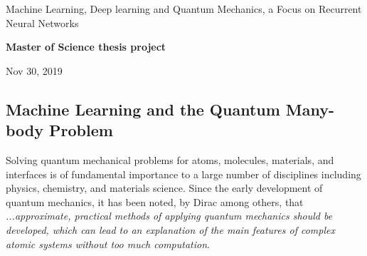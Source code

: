 \documentclass[%
oneside,                 %
final,                   %
10pt]{article}
\begin{document}

\newcommand{\exercisesection}[1]{\subsection*{#1}}






\thispagestyle{empty}

\begin{center}
{\LARGE\bf
\begin{spacing}{1.25}
Machine Learning, Deep learning and Quantum Mechanics, a Focus on Recurrent Neural Networks
\end{spacing}
}
\end{center}


\begin{center}
{\bf Master of Science thesis project${}^{}$} \\ [0mm]
\end{center}

\begin{center}
\end{center}
    

\begin{center}
Nov 30, 2019
\end{center}

\vspace{1cm}


\subsection*{Machine Learning and the Quantum Many-body Problem}

Solving quantum mechanical problems for atoms,  molecules, materials, and
interfaces is of fundamental importance to a large number of
disciplines including physics, chemistry, and materials science. Since
the early development of quantum mechanics, it has been noted, by
Dirac among others, that \emph{...approximate, practical methods of applying quantum mechanics should be developed, which can lead to an explanation of the main features of complex atomic systems without too much computation}. 
\end{document}
